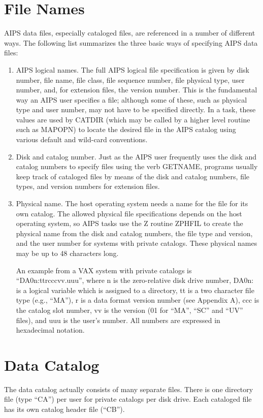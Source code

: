 \section{File Names}
AIPS data files, especially cataloged files, are referenced in a
number of different ways.  The following list summarizes the three
basic ways of specifying AIPS data files:
\begin{enumerate} %
\item AIPS logical names.  The full AIPS logical file specification is given
by disk number, file name, file class, file sequence number, file
physical type, user number, and, for extension files, the version
number.  This is the fundamental way an AIPS user specifies a file;
although some of these, such as physical type and user number, may not
have to be specified directly. In a task, these values are used by
CATDIR (which may be called by a higher level routine such as MAPOPN)
to locate the desired file in the AIPS catalog using various default
and wild-card conventions.
\item Disk and catalog number.  Just as the AIPS user frequently uses the
disk and catalog numbers to specify files using the verb GETNAME,
programs usually keep track of cataloged files by means of the disk
and catalog numbers, file types, and version numbers for extension
files.
\item Physical name.  The host operating system needs a name for the file
for its own catalog.  The allowed physical file specifications depends
on the host operating system, so AIPS tasks use the Z routine ZPHFIL
to create the physical name from the disk and catalog numbers, the
file type and version, and the user number for systems with private
catalogs.  These physical names may be up to 48 characters long.

An example from a VAX system with private catalogs is
``DA0n:ttrcccvv.uuu'', where n is the zero-relative disk drive number,
DA0n: is a logical variable which is assigned to a directory, tt is a
two character file type (e.g., ``MA''), r is a data format version
number (see Appendix A), ccc is the catalog slot number, vv is the
version (01 for ``MA'', ``SC'' and ``UV'' files), and uuu is the user's
number.  All numbers are expressed in hexadecimal notation.
\end{enumerate} %

\section{Data Catalog}
The data catalog actually consists of many separate files. There is
one directory file (type ``CA'') per user for private catalogs per disk
drive.  Each cataloged file has its own catalog header file (``CB'').


